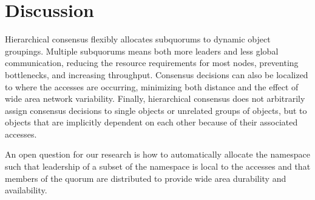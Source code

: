 \documentclass[sigconf]{acmart}
\begin{document}
\section{Discussion}

Hierarchical consensus flexibly allocates subquorums to dynamic object groupings.
Multiple subquorums means both more leaders and less global communication, reducing the
resource requirements for most nodes, preventing bottlenecks, and increasing throughput.
Consensus decisions can also be localized to where the accesses are occurring,
minimizing both distance and the effect of wide area network variability.
Finally, hierarchical consensus does not arbitrarily assign consensus decisions to single
objects or unrelated groups of objects, but to objects that are implicitly dependent on
each other because of their associated accesses.

An open question for our research is how to automatically allocate the namespace such that
leadership of a subset of the namespace is local to the accesses and that members of the
quorum are distributed to provide wide area durability and availability.



\end{document}
